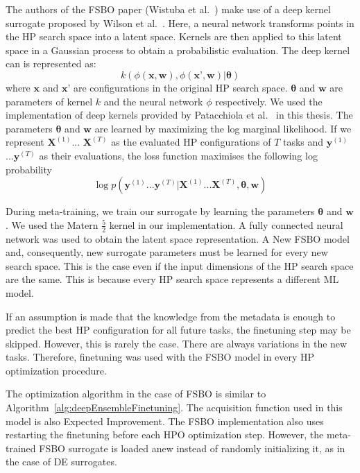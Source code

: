 \documentclass[12pt, twoside, ngerman]{report}
\begin{document}
The authors of the FSBO paper (Wistuba et al.~\cite{fsbopaper}) make use of a deep kernel surrogate proposed by Wilson et al.~\cite{pmlr-v51-wilson16}.
Here, a neural network transforms points in the HP search space into a latent space.
Kernels are then applied to this latent space in a Gaussian process to obtain a probabilistic evaluation.
The deep kernel can is represented as:~\cite{fsbopaper}
$$
k(\phi(\textbf{x}, \textbf{w})  ,   \phi(\textbf{x'}, \textbf{w}) |  \mathbf{\theta})
$$
where $\textbf{x}$ and $\textbf{x'}$ are configurations in the original HP search space. $\mathbf{\theta}$ and $\textbf{w}$ are parameters of kernel $k$ and the neural network $\phi$ respectively.
We used the implementation of deep kernels provided by Patacchiola et al.~\cite{patacchiola2020bayesian} in this thesis.
The parameters $\mathbf{\theta}$ and $\textbf{w}$  are learned by maximizing the log marginal likelihood.
If we represent $\textbf{X}^{(1)}$... $\textbf{X}^{(T)}$ as the evaluated HP configurations of $T$ tasks and $\textbf{y}^{(1)}$...$\textbf{y}^{(T)}$ as their evaluations, the loss function maximises the following log probability
$$
\log p( \textbf{y}^{(1)}...\textbf{y}^{(T)} | \textbf{X}^{(1)}...\textbf{X}^{(T)}, \mathbf{\theta}, \textbf{w})
$$

During meta-training, we train our surrogate by learning the parameters $\mathbf{\theta}$ and $\textbf{w}$.
We used the Matern $\frac{5}{2}$ kernel in our implementation.
A fully connected neural network was used to obtain the latent space representation.
A New FSBO model and, consequently, new surrogate parameters must be learned for every new search space.
This is the case even if the input dimensions of the HP search space are the same.
This is because every HP search space represents a different ML model.

If an assumption is made that the knowledge from the metadata is enough to predict the best HP configuration for all future tasks, the finetuning step may be skipped.
However,  this is rarely the case. There are always variations in the new tasks.
Therefore, finetuning was used with the FSBO model in every HP optimization procedure.

The optimization algorithm in the case of FSBO is similar to Algorithm~\ref{alg:deepEnsembleFinetuning}.
The acquisition function used in this model is also Expected Improvement.
The FSBO implementation also uses restarting the finetuning before each HPO optimization step.
However, the meta-trained FSBO surrogate is loaded anew instead of randomly initializing it, as in the case of DE surrogates.
\end{document}
